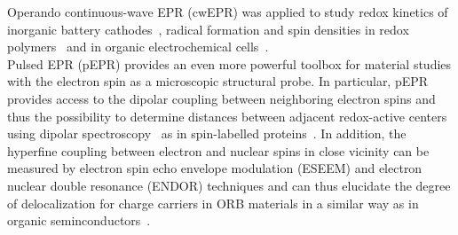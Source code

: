 Operando continuous-wave EPR (cwEPR) was applied to study redox kinetics of inorganic battery cathodes~\cite{Niemoller2019}, radical formation and spin densities in redox polymers~\cite{Dmitrieva2018} and in organic electrochemical cells~\cite{huang2016_jpowersources,Kulikov2022}.\\

Pulsed EPR (pEPR) provides an even more powerful toolbox for material studies with the electron spin as a microscopic structural probe. In particular, pEPR provides access to the dipolar coupling between neighboring electron spins and thus the possibility to determine distances between adjacent redox-active centers using dipolar spectroscopy~\cite{Salikhov1981} as in spin-labelled proteins~\cite{jeschke2012_annrevphyschem,Toropov1998}. In addition, the hyperfine coupling between electron and nuclear spins in close vicinity can be measured by electron spin echo envelope modulation (ESEEM) and electron nuclear double resonance (ENDOR) techniques and can thus elucidate the degree of delocalization for charge carriers in ORB materials in a similar way as in organic seminconductors~\cite{Behrends2011}.

